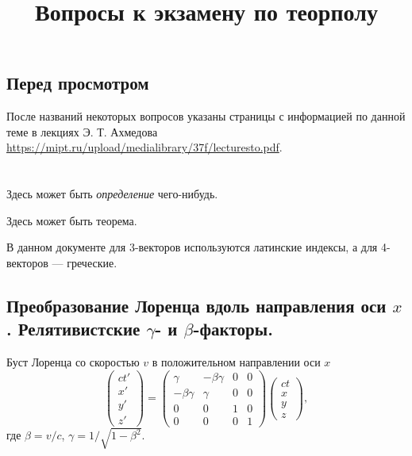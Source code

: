 \documentclass[a4paper,12pt]{article}
\title{Вопросы к экзамену по теорполу}
\begin{document}
%
\maketitle
\subsection*{Перед просмотром}
После названий некоторых вопросов указаны страницы с информацией по данной
теме в лекциях Э. Т. Ахмедова
\url{https://mipt.ru/upload/medialibrary/37f/lecturesto.pdf}.
\tableofcontents
\section{}
\begin{dfn}
	Здесь может быть \emph{определение} чего-нибудь.
\end{dfn}
\begin{thm}
	Здесь может быть теорема.
\end{thm}
В данном документе для 3-векторов используются латинские индексы, а для
4-векторов --- греческие.
\subsection{Преобразование Лоренца вдоль направления оси $x$. Релятивистские
$\gamma$- и $\beta$-факторы.}
\label{subsec:1}
Буст Лоренца со скоростью $v$ в положительном направлении оси  $x$
\[
	\begin{pmatrix} ct' \\ x' \\ y' \\ z' \end{pmatrix} =
	\begin{pmatrix} \gamma & -\beta \gamma & 0 & 0\\
	-\beta \gamma & \gamma & 0 & 0\\
0 & 0 & 1 & 0\\
0 & 0 & 0 & 1\end{pmatrix} 
\begin{pmatrix} ct \\ x \\ y \\ z \end{pmatrix} 
,\] 
где $\beta=v /c$, $\gamma = 1 / \sqrt{1-\beta^2} $.
\end{document}
